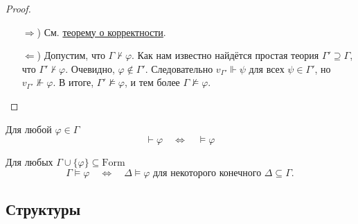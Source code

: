 \documentclass[12pt,a4paper]{article}
\newcommand{\Formul}{\ensuremath{\mathrm{Form}}\xspace}
\begin{document}
    \begin{proof}
        \begin{itemize}
            \item[$\Rightarrow$)] См. \hyperref[Hilbert-conclusion-correctness]{теорему о корректности}.
            \item[$\Leftarrow$)] Допустим, что $\Gamma \nvdash \varphi$. Как нам известно найдётся простая теория $\Gamma' \supseteq \Gamma$, что $\Gamma' \nvdash \varphi$. Очевидно, $\varphi \notin \Gamma'$. Следовательно $v_{\Gamma'} \Vdash \psi$ для всех $\psi \in \Gamma'$, но $v_{\Gamma'} \nVdash \varphi$. В итоге, $\Gamma' \nvDash \varphi$, и тем более $\Gamma \nvDash \varphi$.
        \end{itemize}
    \end{proof}

    \begin{corollary}
        Для любой $\varphi \in \Gamma$
        \[
            \vdash \varphi
            \quad \Longleftrightarrow \quad
            \vDash \varphi
        \]
    \end{corollary}

    \begin{corollary}
        Для любых $\Gamma \cup \{\varphi\} \subseteq \Formul$
        \[
            \Gamma \vDash \varphi
            \quad \Longleftrightarrow \quad
            \Delta \vDash \varphi \text{ для некоторого конечного $\Delta \subseteq \Gamma$}.
        \]
    \end{corollary}

    \subsection{Структуры}
\end{document}
